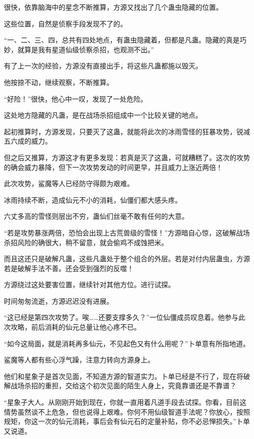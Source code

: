 
\begin{this_body}



很快，依靠脑海中的星念不断推算，方源又找出了几个蛊虫隐藏的位置。

这些位置，自然是侦察手段发现不了的。

“一、二、三、四，总共有四处地点，有蛊虫隐藏着，但都是凡蛊。隐藏的真是巧妙，就算是我有星道仙级侦察杀招，也观测不出。”

有了上一次的经验，方源没有直接出手，将这些凡蛊都施以毁灭。

他按捺不动，继续观察，不断推算。

“好险！”很快，他心中一叹，发现了一处危险。

这处地方隐藏的凡蛊，是在战场杀招组成中一个比较关键的地点。

起初推算时，方源发现，只要灭了这蛊，就能将此次的冰雨雪怪的狂暴攻势，锐减五六成的威力。

但之后又推算，方源这才有更多发现：若真是灭了这蛊，可就糟糕了。这次的攻势的确会威力暴降，但下一次攻势发动的时间更早，并且威力上涨近两倍！

此次攻势，鲨魔等人已经防守得颇为艰难。

冰雨持续不断，造成仙元不小的消耗，仙僵们都大感头疼。

六丈多高的雪怪则层出不穷，蛊仙们丝毫不敢有任何的大意。

“若是攻势暴涨两倍，恐怕会出现上古荒兽级的雪怪！”方源暗自心惊，这破解战场杀招风险的确很大，稍不留意，就会偷鸡不成蚀把米。

而且这还只是破解凡蛊，这些凡蛊处于整个组合的外层。若是对付内层蛊虫，方源若是破解手法不善。还会受到强烈的反噬！

方源绕过这处要害位置，继续针对其他方位。进行试探。

时间匆匆流逝，方源迟迟没有进展。

“这已经是第四次攻势了。唉……还要支撑多久？”一位仙僵成员叹息着。他参与此次攻略，前后消耗的仙元总量让他心疼不已。

“如今这局面，就是消耗再多仙元，不见起色又有什么用呢？”卜单意有所指地道。

鲨魔等人都有些心浮气躁，注意力转向方源身上。

他们和星象子是首次见面，不知道方源的智道实力。卜单已经是不行了，现在将破解战场杀招的重担，交给这个初次见面的陌生人身上，究竟靠谱还是不靠谱？

“星象子大人。从刚刚开始到现在，你就一直用着凡道手段去试探。你看，目前这情势虽然谈不上危急，但也说得上艰难。你何不用仙级智道手法呢？你放心，按照规矩，你这一次的仙元消耗，事后会有仙元石的定量补贴，你不必忌惮损失。”卜单又说道。


\end{this_body}
